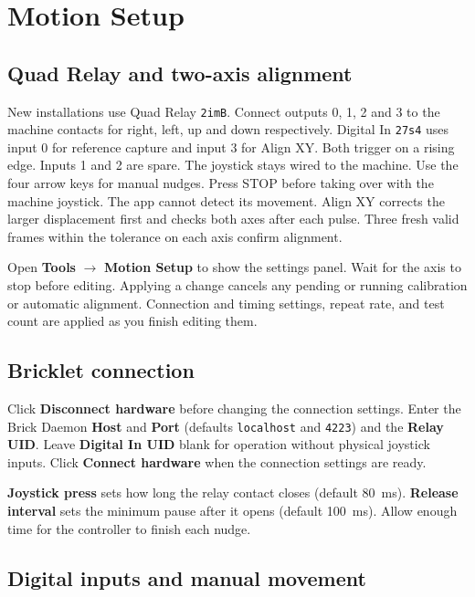 \documentclass[a4paper,11pt]{article}
\begin{document}
\newpage
\section{Motion Setup}
\label{sec:motion-setup}
\subsection{Quad Relay and two-axis alignment}
New installations use Quad Relay \texttt{2imB}. Connect outputs 0, 1, 2 and 3 to the
machine contacts for right, left, up and down respectively. Digital In \texttt{27s4}
uses input 0 for reference capture and input 3 for Align XY. Both trigger on a
rising edge. Inputs 1 and 2 are spare. The joystick stays wired to the machine.
Use the four arrow keys for manual nudges. Press STOP before taking over with the
machine joystick. The app cannot detect its movement.
Align XY corrects the larger displacement first and checks both axes after each
pulse. Three fresh valid frames within the tolerance on each axis confirm alignment.

Open \textbf{Tools} $\rightarrow$ \textbf{Motion Setup} to show the settings
panel. Wait for the axis to stop before editing. Applying a change cancels any
pending or running calibration or automatic alignment. Connection and timing
settings, repeat rate, and test count are applied as you finish editing them.

\subsection{Bricklet connection}

Click \textbf{Disconnect hardware} before changing the connection settings.
Enter the Brick Daemon \textbf{Host} and \textbf{Port} (defaults
\texttt{localhost} and \texttt{4223}) and the \textbf{Relay UID}. Leave
\textbf{Digital In UID} blank for operation without physical joystick inputs.
Click \textbf{Connect hardware} when the connection settings are ready.

\textbf{Joystick press} sets how long the relay contact closes (default 80~ms).
\textbf{Release interval} sets the minimum pause after it opens (default
100~ms). Allow enough time for the controller to finish each nudge.

\newpage
\subsection{Digital inputs and manual movement}
\end{document}
